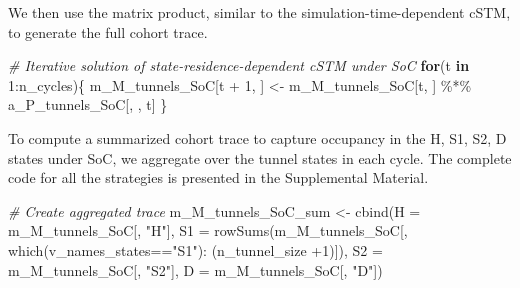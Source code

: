 \documentclass[
]{article}
\newenvironment{Shaded}{\begin{snugshade}}{\end{snugshade}}
\newcommand{\AttributeTok}[1]{\textcolor[rgb]{0.77,0.63,0.00}{#1}}
\newcommand{\CommentTok}[1]{\textcolor[rgb]{0.56,0.35,0.01}{\textit{#1}}}
\newcommand{\ControlFlowTok}[1]{\textcolor[rgb]{0.13,0.29,0.53}{\textbf{#1}}}
\newcommand{\DecValTok}[1]{\textcolor[rgb]{0.00,0.00,0.81}{#1}}
\newcommand{\FunctionTok}[1]{\textcolor[rgb]{0.00,0.00,0.00}{#1}}
\newcommand{\NormalTok}[1]{#1}
\newcommand{\OtherTok}[1]{\textcolor[rgb]{0.56,0.35,0.01}{#1}}
\newcommand{\SpecialCharTok}[1]{\textcolor[rgb]{0.00,0.00,0.00}{#1}}
\newcommand{\StringTok}[1]{\textcolor[rgb]{0.31,0.60,0.02}{#1}}
\begin{document}
We then use the matrix product, similar to the simulation-time-dependent cSTM, to generate the full cohort trace.

\begin{Shaded}
\begin{Highlighting}[]
\CommentTok{\# Iterative solution of state{-}residence{-}dependent cSTM under SoC}
\ControlFlowTok{for}\NormalTok{(t }\ControlFlowTok{in} \DecValTok{1}\SpecialCharTok{:}\NormalTok{n\_cycles)\{}
\NormalTok{  m\_M\_tunnels\_SoC[t }\SpecialCharTok{+} \DecValTok{1}\NormalTok{, ] }\OtherTok{\textless{}{-}}\NormalTok{ m\_M\_tunnels\_SoC[t, ] }\SpecialCharTok{\%*\%}\NormalTok{ a\_P\_tunnels\_SoC[, , t]}
\NormalTok{\}}
\end{Highlighting}
\end{Shaded}

To compute a summarized cohort trace to capture occupancy in the H, S1, S2, D states under SoC, we aggregate over the tunnel states in each cycle. The complete code for all the strategies is presented in the Supplemental Material.

\begin{Shaded}
\begin{Highlighting}[]
\CommentTok{\# Create aggregated trace}
\NormalTok{m\_M\_tunnels\_SoC\_sum }\OtherTok{\textless{}{-}} \FunctionTok{cbind}\NormalTok{(}\AttributeTok{H =}\NormalTok{ m\_M\_tunnels\_SoC[, }\StringTok{"H"}\NormalTok{], }
                             \AttributeTok{S1 =} \FunctionTok{rowSums}\NormalTok{(m\_M\_tunnels\_SoC[, }\FunctionTok{which}\NormalTok{(v\_names\_states}\SpecialCharTok{==}\StringTok{"S1"}\NormalTok{)}\SpecialCharTok{:}
\NormalTok{                                                        (n\_tunnel\_size }\SpecialCharTok{+}\DecValTok{1}\NormalTok{)]), }
                             \AttributeTok{S2 =}\NormalTok{ m\_M\_tunnels\_SoC[, }\StringTok{"S2"}\NormalTok{],}
                             \AttributeTok{D =}\NormalTok{ m\_M\_tunnels\_SoC[, }\StringTok{"D"}\NormalTok{])}
\end{Highlighting}
\end{Shaded}
\end{document}

